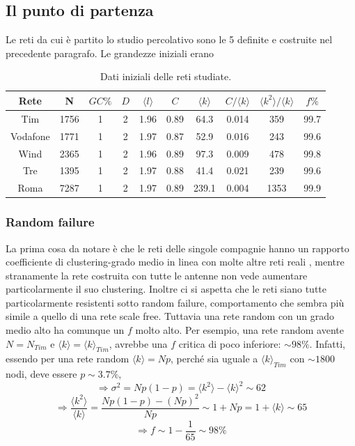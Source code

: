 \subsection{Il punto di partenza}
Le reti da cui è partito lo studio percolativo sono le 5 definite e costruite nel precedente paragrafo. Le grandezze iniziali erano


\begin{table}[t]
\caption{Dati iniziali delle reti studiate.}
	\begin{tabular}{cccccccccc}
	\toprule
	Rete		&N		&$GC\%$	&$D$	&$\langle l\rangle$	&$C$		&$\langle k\rangle$	&$C/\langle k\rangle$	&$\langle k^2\rangle/\langle k\rangle$	&$f\%$\\
	\midrule  
	Tim		&1756	&1		&2	&1.96			&0.89	&64.3			&0.014				&359							&99.7\\
	Vodafone	&1771	&1		&2	&1.97			&0.87	&52.9			&0.016				&243							&99.6\\
	Wind		&2365	&1		&2	&1.96			&0.89	&97.3			&0.009				&478							&99.8\\
	Tre		&1395	&1		&2	&1.97			&0.88	&41.4			&0.021				&239							&99.6\\
	Roma		&7287	&1		&2	&1.97			&0.89	&239.1			&0.004				&1353							&99.9\\
	\bottomrule
	\end{tabular}
\label{tab:datiInitial}
\end{table}

\subsubsection{Random failure}
La prima cosa da notare è che le reti delle singole compagnie hanno un rapporto coefficiente di clustering-grado medio in linea con molte altre reti reali \parencite{Barbalbert2002}, mentre stranamente la rete costruita con tutte le antenne non vede aumentare particolarmente il suo clustering. Inoltre ci si aspetta che le reti siano tutte particolarmente resistenti sotto random failure, comportamento che sembra più simile a quello di una rete scale free. Tuttavia una rete random con un grado medio alto ha comunque un $f$ molto alto. Per esempio, una rete random avente $N = N_{Tim}$ e $\langle k \rangle = \langle k \rangle_{Tim}$, avrebbe una $f$ critica di poco inferiore: $\sim 98\%$. Infatti, essendo per una rete random $\langle k \rangle = Np$, perché sia uguale a $\langle k \rangle_{Tim}$ con $\sim 1800$ nodi, deve essere $p \sim 3.7\%$, 
$$\Rightarrow \sigma^2 = Np(1-p) = \langle k^2 \rangle - \langle k \rangle^2 \sim 62$$
$$\Rightarrow \frac{\langle k^2 \rangle }{\langle k \rangle} = \frac{Np(1-p)-(Np)^2}{Np} \sim 1+Np = 1+ \langle k \rangle \sim 65$$
$$\Rightarrow f \sim 1 - \frac{1}{65} \sim 98\%$$

